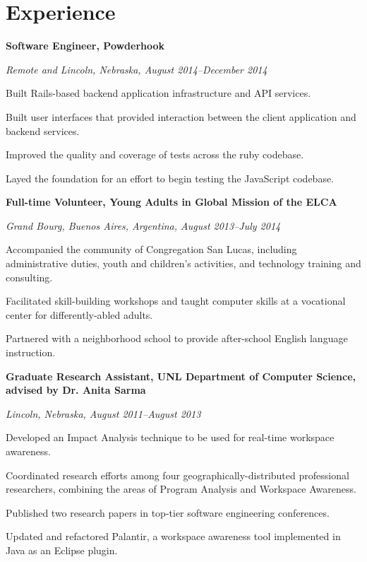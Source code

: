 \documentclass[10pt,letterpaper]{article}
\renewenvironment{itemize}{
  \begin{list}{}{
    \setlength{\leftmargin}{1.5em}
    \setlength{\itemsep}{0.25em}
    \setlength{\parskip}{0pt}
    \setlength{\parsep}{0.25em}
  }
}{
  \end{list}
}
\begin{document}
\section*{Experience}

\begin{itemize}
\item \textbf{Software Engineer, Powderhook}
\item \emph{Remote and Lincoln, Nebraska, August 2014--December 2014}
    \begin{itemize}
    \item Built Rails-based backend application infrastructure and API
    services.
    \item Built user interfaces that provided interaction between the client
    application and backend services.
    \item Improved the quality and coverage of tests across the ruby
    codebase.
    \item Layed the foundation for an effort to begin testing the JavaScript
    codebase.
    \end{itemize}
\end{itemize}

\begin{itemize}
\item \textbf{Full-time Volunteer, Young Adults in Global Mission of the ELCA}
\item \emph{Grand Bourg, Buenos Aires, Argentina, August 2013--July 2014}
	\begin{itemize}
    \item Accompanied the community of Congregation San Lucas, including
    administrative duties, youth and children's activities, and technology
    training and consulting.
    \item Facilitated skill-building workshops and taught computer skills at
    a vocational center for differently-abled adults.
    \item Partnered with a neighborhood school to provide after-school
    English language instruction.
	\end{itemize}
\end{itemize}

\begin{itemize}
\item \textbf{Graduate Research Assistant, UNL Department of Computer Science, advised by Dr. Anita Sarma}
\item \emph{Lincoln, Nebraska, August 2011--August 2013}
	\begin{itemize}
	\item Developed an Impact Analysis technique to be used for real-time
    workspace awareness.
    \item Coordinated research efforts among four
    geographically-distributed
    professional researchers, combining the areas of Program Analysis and
    Workspace Awareness.
    \item Published two research papers in top-tier software engineering
    conferences.
	\item Updated and refactored Palantir, a workspace awareness tool
    implemented in Java as an Eclipse plugin.
	\end{itemize}
\end{itemize}
\end{document}
